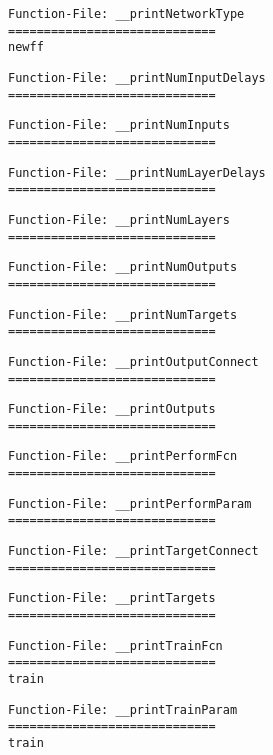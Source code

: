 \begin{verbatim}
Function-File: __printNetworkType
=============================
newff
\end{verbatim}
\begin{verbatim}
Function-File: __printNumInputDelays
=============================
\end{verbatim}
\begin{verbatim}
Function-File: __printNumInputs
=============================
\end{verbatim}
\begin{verbatim}
Function-File: __printNumLayerDelays
=============================
\end{verbatim}
\begin{verbatim}
Function-File: __printNumLayers
=============================
\end{verbatim}
\begin{verbatim}
Function-File: __printNumOutputs
=============================
\end{verbatim}
\begin{verbatim}
Function-File: __printNumTargets
=============================
\end{verbatim}
\begin{verbatim}
Function-File: __printOutputConnect
=============================
\end{verbatim}
\begin{verbatim}
Function-File: __printOutputs
=============================
\end{verbatim}
\begin{verbatim}
Function-File: __printPerformFcn
=============================
\end{verbatim}
\begin{verbatim}
Function-File: __printPerformParam
=============================
\end{verbatim}
\begin{verbatim}
Function-File: __printTargetConnect
=============================
\end{verbatim}
\begin{verbatim}
Function-File: __printTargets
=============================
\end{verbatim}
\begin{verbatim}
Function-File: __printTrainFcn
=============================
train
\end{verbatim}
\begin{verbatim}
Function-File: __printTrainParam
=============================
train
\end{verbatim}
